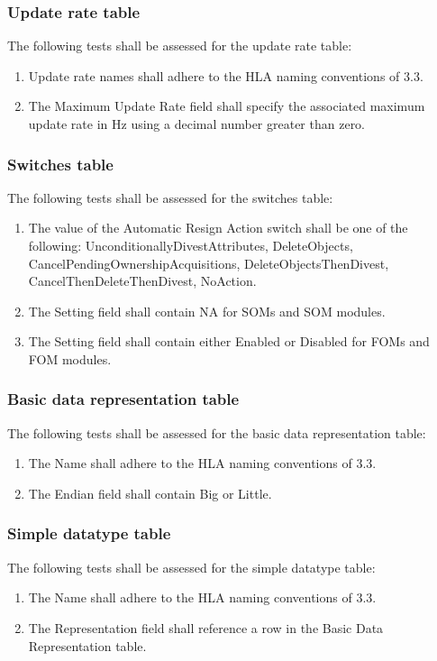 \subsubsection{Update rate table}
The following tests shall be assessed for the update rate table:
\begin{enumerate}[label=\arabic*),leftmargin=42pt,labelsep=8pt,itemsep=1.2pt,topsep=2pt]
\item Update rate names shall adhere to the HLA naming conventions of 3.3.
\item The Maximum Update Rate field shall specify the associated maximum update rate in Hz using a decimal number greater than zero.
\end{enumerate}

\subsubsection{Switches table}
The following tests shall be assessed for the switches table:
\begin{enumerate}[label=\arabic*),leftmargin=42pt,labelsep=8pt,itemsep=1.2pt,topsep=2pt]
\item The value of the Automatic Resign Action switch shall be one of the following: UnconditionallyDivestAttributes, DeleteObjects, CancelPendingOwnershipAcquisitions, DeleteObjectsThenDivest, CancelThenDeleteThenDivest, NoAction.
\item The Setting field shall contain NA for SOMs and SOM modules.
\item The Setting field shall contain either Enabled or Disabled for FOMs and FOM modules.
\end{enumerate}

\subsubsection{Basic data representation table}
The following tests shall be assessed for the basic data representation table:
\begin{enumerate}[label=\arabic*),leftmargin=42pt,labelsep=8pt,itemsep=1.2pt,topsep=2pt]
\item The Name shall adhere to the HLA naming conventions of 3.3.
\item The Endian field shall contain Big or Little.
\end{enumerate}

\subsubsection{Simple datatype table}
The following tests shall be assessed for the simple datatype table:
\begin{enumerate}[label=\arabic*),leftmargin=42pt,labelsep=8pt,itemsep=1.2pt,topsep=2pt]
\item The Name shall adhere to the HLA naming conventions of 3.3.
\item The Representation field shall reference a row in the Basic Data Representation table.
\end{enumerate}

